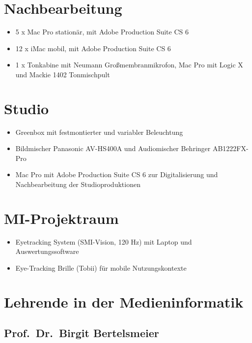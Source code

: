 \section{Nachbearbeitung}\label{nachbearbeitung}

\begin{itemize}
\tightlist
\item
  5 x Mac Pro stationär, mit Adobe Production Suite CS 6
\item
  12 x iMac mobil, mit Adobe Production Suite CS 6
\item
  1 x Tonkabine mit Neumann Großmembranmikrofon, Mac Pro mit Logic X und
  Mackie 1402 Tonmischpult
\end{itemize}

\section{Studio}\label{studio}

\begin{itemize}
\tightlist
\item
  Greenbox mit festmontierter und variabler Beleuchtung
\item
  Bildmischer Panasonic AV-HS400A und Audiomischer Behringer
  AB1222FX-Pro
\item
  Mac Pro mit Adobe Production Suite CS 6 zur Digitalisierung und
  Nachbearbeitung der Studioproduktionen
\end{itemize}

\section{MI-Projektraum}\label{mi-projektraum}

\begin{itemize}
\tightlist
\item
  Eyetracking System (SMI-Vision, 120 Hz) mit Laptop und
  Auswertungssoftware
\item
  Eye-Tracking Brille (Tobii) für mobile Nutzungskontexte
\end{itemize}

\section{Lehrende in der
Medieninformatik}\label{lehrende-in-der-medieninformatik}

\subsection{Prof.~Dr.~Birgit
Bertelsmeier}\label{prof.dr.birgit-bertelsmeier}

